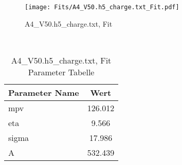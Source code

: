 \begin{figure}[ht] 
 	\centering 
 	\texttt{[image: Fits/A4\_V50.h5\_charge.txt\_Fit.pdf]} 
	\caption{A4_V50.h5_charge.txt, Fit} 
 	\label{fig:A4_V50.h5_charge.txt, Fit} 
\end{figure}
 \\ 
\begin{table}[ht] 
\centering 
\caption{A4_V50.h5_charge.txt, Fit Parameter Tabelle} 
\label{tab:my-table}
\begin{tabular}{|l|c|}
\hline
Parameter Name	&	Wert \\ \hline
mpv	&	 126.012\\ \hline
eta	&	 9.566\\ \hline
sigma	&	 17.986\\ \hline
A	&	 532.439\\ \hline
\end{tabular} 
\end{table}